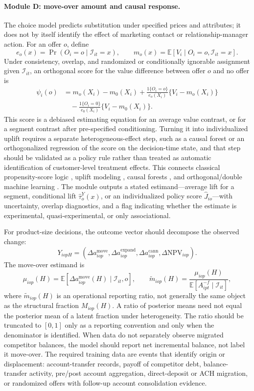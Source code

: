 \documentclass[11pt]{article}
\begin{document}
\paragraph{Module D: move-over amount and causal response.}
The choice model predicts substitution under specified prices and attributes;
it does not by itself identify the effect of marketing contact or
relationship-manager action. For an offer $o$, define
\[
  e_o(x)=\Pr(O_i=o\mid \mathcal{I}_{it}=x),\qquad
  m_o(x)=\mathbb{E}[V_i\mid O_i=o,\mathcal{I}_{it}=x].
\]
Under consistency, overlap, and randomized or conditionally ignorable assignment
given $\mathcal{I}_{it}$, an orthogonal score for the value difference between
offer $o$ and no offer is
\[
\begin{aligned}
  \psi_i(o)
  &=
  m_o(X_i)-m_0(X_i)
  +\frac{1\{O_i=o\}}{e_o(X_i)}\{V_i-m_o(X_i)\}\\
  &\quad
  -\frac{1\{O_i=0\}}{e_0(X_i)}\{V_i-m_0(X_i)\}.
\end{aligned}
\]
This score is a debiased estimating equation for an average value contrast, or
for a segment contrast after pre-specified conditioning. Turning it into
individualized uplift requires a separate heterogeneous-effect step, such as a
causal forest or an orthogonalized regression of the score on the decision-time
state, and that step should be validated as a policy rule rather than treated as
automatic identification of customer-level treatment effects. This connects
classical
propensity-score logic \citep{rosenbaum1983propensity}, uplift modeling
\citep{lo2002true}, causal forests \citep{wager2018causalforests}, and
orthogonal/double machine learning \citep{chernozhukov2018dml}. The module
outputs a stated estimand---average lift for a segment, conditional lift
$\widehat{\tau}_{o}^{Y}(x)$, or an individualized policy score
$\widehat{J}_{io}$---with uncertainty, overlap diagnostics, and a flag
indicating whether the estimate is experimental, quasi-experimental, or only
associational.

For product-size decisions, the outcome vector should decompose the observed
change:
\[
  Y_{iopH}
  =
  \left(
    \Delta a_{iop}^{\mathrm{move}},
    \Delta a_{iop}^{\mathrm{expand}},
    \Delta a_{iop}^{\mathrm{cann}},
    \Delta \mathrm{NPV}_{iop}
  \right).
\]
The move-over estimand is
\[
  \mu_{iop}(H)
  =
  \mathbb{E}\!\left[
  \Delta a_{iop}^{\mathrm{move}}(H)
  \mid \mathcal{I}_{it},o
  \right],
  \qquad
  \widetilde{m}_{iop}(H)=
  \frac{\mu_{iop}(H)}
       {\mathbb{E}[A_{ipt}^{-f}\mid\mathcal{I}_{it}]},
\]
where $\widetilde{m}_{iop}(H)$ is an operational reporting ratio, not generally
the same object as the structural fraction $M_{iop}(H)$. A ratio of posterior
means need not equal the posterior mean of a latent fraction under
heterogeneity. The ratio should be truncated to $[0,1]$ only as a reporting
convention and only when the denominator is identified. When data do not
separately observe migrated competitor balances, the model should report net
incremental balance, not label it move-over. The
required training data are events that identify origin or displacement:
account-transfer records, payoff of competitor debt, balance-transfer activity,
pre/post account aggregation, direct-deposit or ACH migration, or randomized
offers with follow-up account consolidation evidence.
\end{document}
